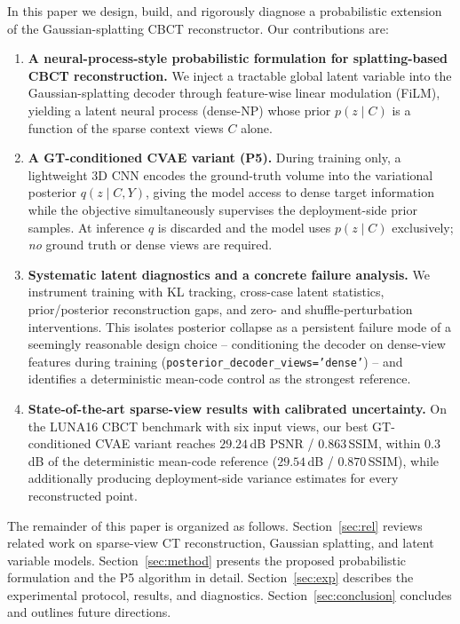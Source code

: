 In this paper we design, build, and rigorously diagnose a probabilistic
extension of the Gaussian-splatting CBCT reconstructor. Our contributions
are:

\begin{enumerate}
\item \textbf{A neural-process-style probabilistic formulation for
splatting-based CBCT reconstruction.} We inject a tractable global latent
variable into the Gaussian-splatting decoder through feature-wise linear
modulation (FiLM), yielding a latent neural process (dense-NP) whose prior
$p(z\mid C)$ is a function of the sparse context views $C$ alone.

\item \textbf{A GT-conditioned CVAE variant (P5).} During training only, a
lightweight 3D CNN encodes the ground-truth volume into the variational
posterior $q(z\mid C,Y)$, giving the model access to dense target
information while the objective simultaneously supervises the
deployment-side prior samples. At inference $q$ is discarded and the model
uses $p(z\mid C)$ exclusively; \emph{no} ground truth or dense views are
required.

\item \textbf{Systematic latent diagnostics and a concrete failure
analysis.} We instrument training with KL tracking, cross-case latent
statistics, prior/posterior reconstruction gaps, and zero- and
shuffle-perturbation interventions. This isolates posterior collapse as a
persistent failure mode of a seemingly reasonable design choice --
conditioning the decoder on dense-view features during training
(\texttt{posterior\_decoder\_views='dense'}) -- and identifies a
deterministic mean-code control as the strongest reference.

\item \textbf{State-of-the-art sparse-view results with calibrated
uncertainty.} On the LUNA16 CBCT benchmark with six input views, our best
GT-conditioned CVAE variant reaches $29.24$\,dB PSNR / $0.863$\,SSIM, within
$0.3$\,dB of the deterministic mean-code reference ($29.54$\,dB /
$0.870$\,SSIM), while additionally producing deployment-side variance
estimates for every reconstructed point.
\end{enumerate}

The remainder of this paper is organized as follows. Section~\ref{sec:rel}
reviews related work on sparse-view CT reconstruction, Gaussian
splatting, and latent variable models. Section~\ref{sec:method} presents
the proposed probabilistic formulation and the P5 algorithm in detail.
Section~\ref{sec:exp} describes the experimental protocol, results, and
diagnostics. Section~\ref{sec:conclusion} concludes and outlines future
directions.